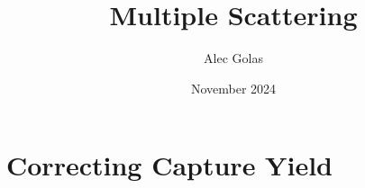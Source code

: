 \documentclass{article}
\title{Multiple Scattering}
\author{Alec Golas}
\date{November 2024}
\begin{document}


\section{Correcting Capture Yield}
\label{sec:capture-yield-correction}

\end{document}
